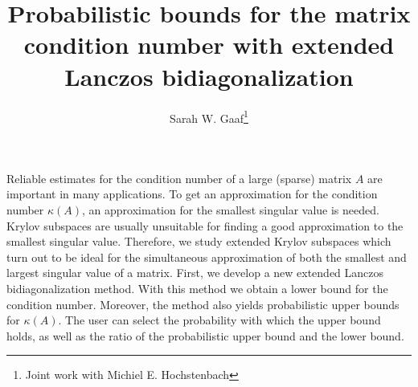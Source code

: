 \documentclass{article}
\title{Probabilistic bounds for the matrix condition number with extended Lanczos bidiagonalization}
\author{Sarah W. Gaaf\thanks{Joint work with Michiel E. Hochstenbach}}
\affil{PhD student at Eindhoven University of Technology}
\date{}
\begin{document}
\maketitle
\setcounter{page}{15}
Reliable estimates for the condition number of a large (sparse) matrix $A$ are important in many applications.
To get an approximation for the condition number $\kappa(A)$, an approximation for the smallest
singular value is needed. Krylov subspaces are usually unsuitable for finding a good approximation
to the smallest singular value.
Therefore, we study extended Krylov subspaces which turn out to be ideal for the simultaneous
approximation of both the smallest and largest singular value of a matrix.
First, we develop a new extended Lanczos bidiagonalization method.
With this method we obtain a lower bound for the condition number.
Moreover, the method also yields probabilistic upper bounds for $\kappa(A)$.
The user can select the probability with which the upper bound holds,
as well as the ratio of the probabilistic upper bound and the lower bound.
\end{document}
